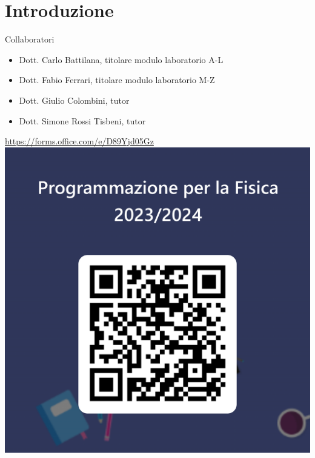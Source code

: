 
\section*{Introduzione}

\begin{frame}{Collaboratori}

  \begin{itemize}
  \item Dott. Carlo Battilana, titolare modulo laboratorio A-L
  \item Dott. Fabio Ferrari, titolare modulo laboratorio M-Z
  \item Dott. Giulio Colombini, tutor
  \item Dott. Simone Rossi Tisbeni, tutor
  \end{itemize}

\end{frame}

\begin{frame}
  \begin{center}
    \vfill
    \url{https://forms.office.com/e/D89Yjd05Gz}
    \vfill
    \includegraphics[trim={400 200 400 600},clip,height=.6\textheight]{images/sondaggio-qr.png}
    \vfill
  \end{center}
\end{frame}

